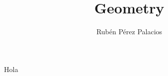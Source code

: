 \documentclass[10pt,letterpaper]{article}
\author{Rubén Pérez Palacios}
\title{Geometry}
\begin{document}
Hola
\end{document}

